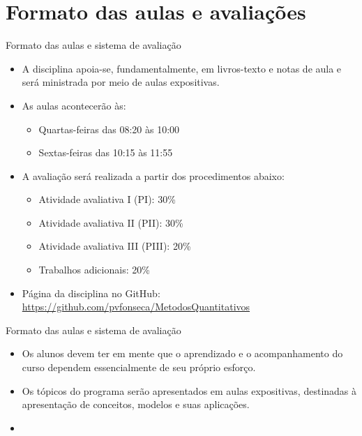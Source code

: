 \documentclass[10pt]{beamer}
\begin{document}
\section{Formato das aulas e avaliações}
\begin{frame}{Formato das aulas e sistema de avaliação}
    \begin{itemize}
        \item A disciplina apoia-se, fundamentalmente, em livros-texto e notas de aula e será ministrada por meio de aulas expositivas.\bigskip

        \item As aulas acontecerão às:
              \begin{itemize}
                  \item Quartas-feiras das 08:20 às 10:00
                  \item Sextas-feiras das 10:15 às 11:55\bigskip
              \end{itemize}

        \item A avaliação será realizada a partir dos procedimentos abaixo:
              \begin{itemize}
                  \item Atividade avaliativa I (PI): 30\%
                  \item Atividade avaliativa II (PII): 30\%
                  \item Atividade avaliativa III (PIII): 20\%
                  \item Trabalhos adicionais: 20\%\bigskip
              \end{itemize}

        \item Página da disciplina no GitHub: \href{github.com/pvfonseca/MetodosQuantitativos}{https://github.com/pvfonseca/MetodosQuantitativos}
    \end{itemize}
\end{frame}

\begin{frame}{Formato das aulas e sistema de avaliação}
    \begin{itemize}
        \item Os alunos devem ter em mente que o aprendizado e o acompanhamento do curso dependem essencialmente de seu próprio esforço.\bigskip

        \item Os tópicos do programa serão apresentados em aulas expositivas, destinadas à apresentação de conceitos, modelos e suas aplicações.\bigskip

        \item[\emoji{warning}] 
    \end{itemize}

\end{frame}
\end{document}
